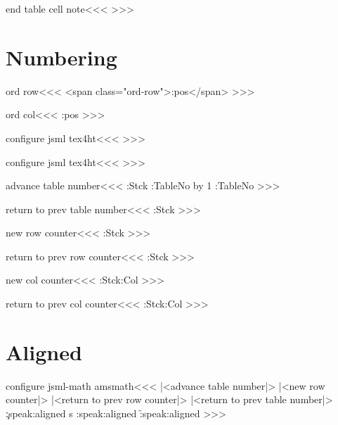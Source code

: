 {\<end table cell note\><<<
>>>


\section{Numbering}


     
\<ord row\><<<
<span class="ord-row">\ord:pos{\HRow}</span>%
>>>

\<ord col\><<<
\ord:pos{\HCol}%
>>>


\<configure jsml tex4ht\><<<
\def\ord:pos#1{%
   \ifcase #1
   \or first
   \or second
   \or third
   \or fourth
   \or fifth
   \or sixth
   \or seventh
   \or eighth
   \or nineth
   \else #1th
   \fi
}
>>>





\<configure jsml tex4ht\><<<
\HAssign{}
>>>

\<advance table number\><<<
\PushStack\Table:Stck\TableNo
\gHAdvance\Next:TableNo by 1 
\global\let\TableNo=\Next:TableNo 
>>>

\<return to prev table number\><<<
\PopStack\Table:Stck\TableNo 
>>>







\<new row counter\><<<
\PushStack\Row:Stck\HRow     \HAssign{}\relax
>>>

\<return to prev row counter\><<<
\PopStack\Row:Stck\HRow
>>>

\<new col counter\><<<
\PushStack\Col:Stck\Prev:Col
>>>

\<return to prev col counter\><<<
\PopStack\Col:Stck\Prev:Col
>>>




\section{Aligned}



\<configure jsml-math amsmath\><<<
   {|<advance table number|>%
    |<new row counter|>%
    }
   {\Tag{aligned-\TableNo}{\hrow:s}%
    \ifvmode \IgnorePar\fi 
    |<return to prev row counter|>%
    |<return to prev table number|>}
   {\c:speak:aligned}%
   {\xdef\hrow:s{\HRow}}%
   {%
    \e:speak:aligned }
   {\f:speak:aligned
    }
>>>

}
